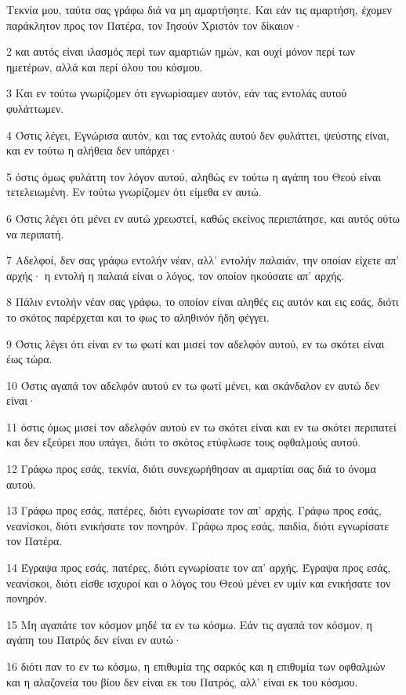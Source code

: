 \par Τεκνία μου, ταύτα σας γράφω διά να μη αμαρτήσητε. Και εάν τις αμαρτήση, έχομεν παράκλητον προς τον Πατέρα, τον Ιησούν Χριστόν τον δίκαιον·
\par 2 και αυτός είναι ιλασμός περί των αμαρτιών ημών, και ουχί μόνον περί των ημετέρων, αλλά και περί όλου του κόσμου.
\par 3 Και εν τούτω γνωρίζομεν ότι εγνωρίσαμεν αυτόν, εάν τας εντολάς αυτού φυλάττωμεν.
\par 4 Όστις λέγει, Εγνώρισα αυτόν, και τας εντολάς αυτού δεν φυλάττει, ψεύστης είναι, και εν τούτω η αλήθεια δεν υπάρχει·
\par 5 όστις όμως φυλάττη τον λόγον αυτού, αληθώς εν τούτω η αγάπη του Θεού είναι τετελειωμένη. Εν τούτω γνωρίζομεν ότι είμεθα εν αυτώ.
\par 6 Όστις λέγει ότι μένει εν αυτώ χρεωστεί, καθώς εκείνος περιεπάτησε, και αυτός ούτω να περιπατή.
\par 7 Αδελφοί, δεν σας γράφω εντολήν νέαν, αλλ' εντολήν παλαιάν, την οποίαν είχετε απ' αρχής· η εντολή η παλαιά είναι ο λόγος, τον οποίον ηκούσατε απ' αρχής.
\par 8 Πάλιν εντολήν νέαν σας γράφω, το οποίον είναι αληθές εις αυτόν και εις εσάς, διότι το σκότος παρέρχεται και το φως το αληθινόν ήδη φέγγει.
\par 9 Όστις λέγει ότι είναι εν τω φωτί και μισεί τον αδελφόν αυτού, εν τω σκότει είναι έως τώρα.
\par 10 Όστις αγαπά τον αδελφόν αυτού εν τω φωτί μένει, και σκάνδαλον εν αυτώ δεν είναι·
\par 11 όστις όμως μισεί τον αδελφόν αυτού εν τω σκότει είναι και εν τω σκότει περιπατεί και δεν εξεύρει που υπάγει, διότι το σκότος ετύφλωσε τους οφθαλμούς αυτού.
\par 12 Γράφω προς εσάς, τεκνία, διότι συνεχωρήθησαν αι αμαρτίαι σας διά το όνομα αυτού.
\par 13 Γράφω προς εσάς, πατέρες, διότι εγνωρίσατε τον απ' αρχής. Γράφω προς εσάς, νεανίσκοι, διότι ενικήσατε τον πονηρόν. Γράφω προς εσάς, παιδία, διότι εγνωρίσατε τον Πατέρα.
\par 14 Έγραψα προς εσάς, πατέρες, διότι εγνωρίσατε τον απ' αρχής. Έγραψα προς εσάς, νεανίσκοι, διότι είσθε ισχυροί και ο λόγος του Θεού μένει εν υμίν και ενικήσατε τον πονηρόν.
\par 15 Μη αγαπάτε τον κόσμον μηδέ τα εν τω κόσμω. Εάν τις αγαπά τον κόσμον, η αγάπη του Πατρός δεν είναι εν αυτώ·
\par 16 διότι παν το εν τω κόσμω, η επιθυμία της σαρκός και η επιθυμία των οφθαλμών και η αλαζονεία του βίου δεν είναι εκ του Πατρός, αλλ' είναι εκ του κόσμου.
